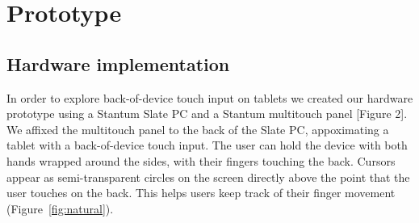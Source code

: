 \section{Prototype}

\subsection{Hardware implementation}

In order to explore back-of-device touch input on tablets we created
our hardware prototype using a Stantum Slate PC and a Stantum
multitouch panel [Figure 2]. We affixed the multitouch panel to the
back of the Slate PC, appoximating a tablet with a back-of-device
touch input. The user can hold the device with both hands wrapped
around the sides, with their fingers touching the back.  Cursors
appear as semi-transparent circles on the screen directly above the
point that the user touches on the back. This helps users keep track
of their finger movement (Figure~\ref{fig:natural}).

